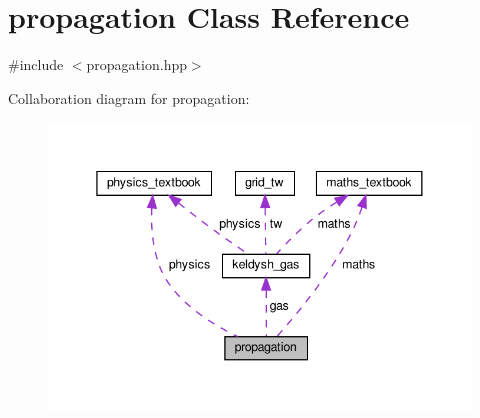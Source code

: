 \hypertarget{classpropagation}{}\section{propagation Class Reference}
\label{classpropagation}


{\ttfamily \#include $<$propagation.\+hpp$>$}



Collaboration diagram for propagation\+:
\nopagebreak
\begin{figure}[H]
\begin{center}
\leavevmode
\includegraphics[width=345pt]{classpropagation__coll__graph}
\end{center}
\end{figure}
